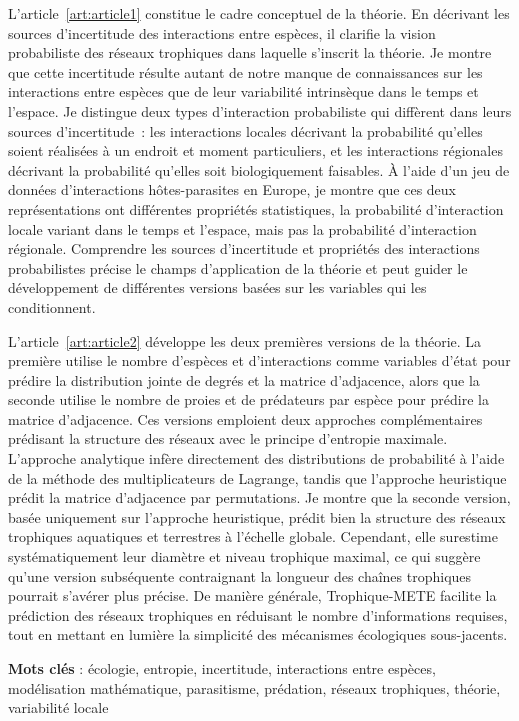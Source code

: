 \documentclass[12pt,twoside,phd]{dms}
\numberwithin{equation}{section}
\numberwithin{table}{chapter}
\numberwithin{figure}{chapter}
\begin{document}
L'article~\ref{art:article1} constitue le cadre conceptuel de la théorie. En
décrivant les sources d'incertitude des interactions entre espèces, il clarifie
la vision probabiliste des réseaux trophiques dans laquelle s'inscrit la
théorie. Je montre que cette incertitude résulte autant de notre manque de
connaissances sur les interactions entre espèces que de leur variabilité
intrinsèque dans le temps et l'espace. Je distingue deux types d'interaction
probabiliste qui diffèrent dans leurs sources d'incertitude~: les interactions
locales décrivant la probabilité qu'elles soient réalisées à un endroit et
moment particuliers, et les interactions régionales décrivant la probabilité
qu'elles soit biologiquement faisables. À l'aide d'un jeu de données
d'interactions hôtes-parasites en Europe, je montre que ces deux représentations
ont différentes propriétés statistiques, la probabilité d'interaction locale
variant dans le temps et l'espace, mais pas la probabilité d'interaction
régionale. Comprendre les sources d'incertitude et propriétés des interactions
probabilistes précise le champs d'application de la théorie et peut guider le
développement de différentes versions basées sur les variables qui les
conditionnent.

L'article~\ref{art:article2} développe les deux premières versions de la
théorie. La première utilise le nombre d'espèces et d'interactions comme
variables d'état pour prédire la distribution jointe de degrés et la matrice
d'adjacence, alors que la seconde utilise le nombre de proies et de prédateurs
par espèce pour prédire la matrice d'adjacence. Ces versions emploient deux
approches complémentaires prédisant la structure des réseaux avec le principe
d'entropie maximale. L'approche analytique infère directement des distributions
de probabilité à l'aide de la méthode des multiplicateurs de Lagrange, tandis
que l'approche heuristique prédit la matrice d'adjacence par permutations. Je
montre que la seconde version, basée uniquement sur l'approche heuristique,
prédit bien la structure des réseaux trophiques aquatiques et terrestres à
l'échelle globale. Cependant, elle surestime systématiquement leur diamètre et
niveau trophique maximal, ce qui suggère qu'une version subséquente contraignant
la longueur des chaînes trophiques pourrait s'avérer plus précise. De manière
générale, Trophique-METE facilite la prédiction des réseaux trophiques en
réduisant le nombre d'informations requises, tout en mettant en lumière la
simplicité des mécanismes écologiques sous-jacents.

\textbf{Mots clés} : écologie, entropie, incertitude, interactions entre
espèces, modélisation mathématique, parasitisme, prédation, réseaux trophiques,
théorie, variabilité locale  
\end{document}
